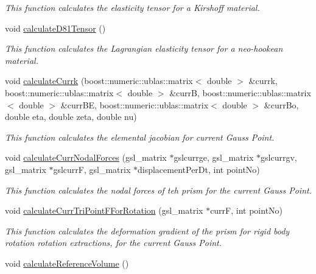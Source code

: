 \begin{DoxyCompactItemize}
\begin{DoxyCompactList}\small\item\em This function calculates the elasticity tensor for a Kirshoff material. \end{DoxyCompactList}\item 
void \hyperlink{classPrism_ad339c17c6a056074dc4e642de9492c57}{calculate\+D81\+Tensor} ()
\begin{DoxyCompactList}\small\item\em This function calculates the Lagrangian elasticity tensor for a neo-\/hookean material. \end{DoxyCompactList}\item 
\hypertarget{classPrism_aa433244f86cdf23a611a1adc3391c3f0}{}void \hyperlink{classPrism_aa433244f86cdf23a611a1adc3391c3f0}{calculate\+Currk} (boost\+::numeric\+::ublas\+::matrix$<$ double $>$ \&currk, boost\+::numeric\+::ublas\+::matrix$<$ double $>$ \&curr\+B, boost\+::numeric\+::ublas\+::matrix$<$ double $>$ \&curr\+B\+E, boost\+::numeric\+::ublas\+::matrix$<$ double $>$ \&curr\+Bo, double eta, double zeta, double nu)\label{classPrism_aa433244f86cdf23a611a1adc3391c3f0}

\begin{DoxyCompactList}\small\item\em This function calculates the elemental jacobian for current Gauss Point. \end{DoxyCompactList}\item 
void \hyperlink{classPrism_a606fbf422f9d652e0f697ea93dc2e088}{calculate\+Curr\+Nodal\+Forces} (gsl\+\_\+matrix $\ast$gslcurrge, gsl\+\_\+matrix $\ast$gslcurrgv, gsl\+\_\+matrix $\ast$gslcurr\+F, gsl\+\_\+matrix $\ast$displacement\+Per\+Dt, int point\+No)
\begin{DoxyCompactList}\small\item\em This function calculates the nodal forces of teh prism for the current Gauss Point. \end{DoxyCompactList}\item 
void \hyperlink{classPrism_ae9403142a217a005a4d588a6e472be27}{calculate\+Curr\+Tri\+Point\+F\+For\+Rotation} (gsl\+\_\+matrix $\ast$curr\+F, int point\+No)
\begin{DoxyCompactList}\small\item\em This function calculates the deformation gradient of the prism for rigid body rotation rotation extractions, for the current Gauss Point. \end{DoxyCompactList}\item 
\hypertarget{classPrism_a4ea58fd729a2bbef20530200978a8f75}{}void \hyperlink{classPrism_a4ea58fd729a2bbef20530200978a8f75}{calculate\+Reference\+Volume} ()\label{classPrism_a4ea58fd729a2bbef20530200978a8f75}


\end{DoxyCompactItemize}
